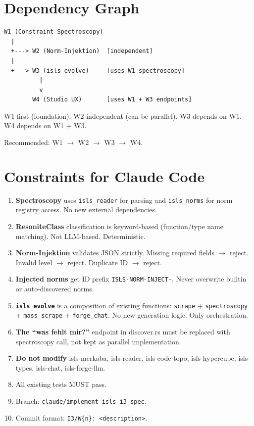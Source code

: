 \documentclass[11pt,a4paper]{article}
\begin{document}
\section{Dependency Graph}

\begin{verbatim}
W1 (Constraint Spectroscopy)
  |
  +---> W2 (Norm-Injektion)  [independent]
  |
  +---> W3 (isls evolve)     [uses W1 spectroscopy]
          |
          v
        W4 (Studio UX)       [uses W1 + W3 endpoints]
\end{verbatim}

W1 first (foundation). W2 independent (can be parallel). 
W3 depends on W1. W4 depends on W1 + W3.

Recommended: W1 $\to$ W2 $\to$ W3 $\to$ W4.


\section{Constraints for Claude Code}

\begin{enumerate}
\item \textbf{Spectroscopy} uses \texttt{isls\_reader} for parsing 
      and \texttt{isls\_norms} for norm registry access. No new 
      external dependencies.
\item \textbf{ResoniteClass} classification is keyword-based 
      (function/type name matching). Not LLM-based. Deterministic.
\item \textbf{Norm-Injektion} validates JSON strictly. Missing 
      required fields $\to$ reject. Invalid level $\to$ reject. 
      Duplicate ID $\to$ reject.
\item \textbf{Injected norms} get ID prefix 
      \texttt{ISLS-NORM-INJECT-}. Never overwrite builtin or 
      auto-discovered norms.
\item \textbf{\texttt{isls evolve}} is a composition of existing 
      functions: \texttt{scrape} + \texttt{spectroscopy} + 
      \texttt{mass\_scrape} + \texttt{forge\_chat}. No new 
      generation logic. Only orchestration.
\item \textbf{The ``was fehlt mir?''} endpoint in discover.rs 
      must be replaced with spectroscopy call, not kept as 
      parallel implementation.
\item \textbf{Do not modify} isls-merkaba, isls-reader, 
      isls-code-topo, isls-hypercube, isls-types, isls-chat, 
      isls-forge-llm.
\item All existing tests MUST pass.
\item Branch: \texttt{claude/implement-isls-i3-spec}.
\item Commit format: \texttt{I3/W\{n\}: <description>}.
\end{enumerate}
\end{document}
